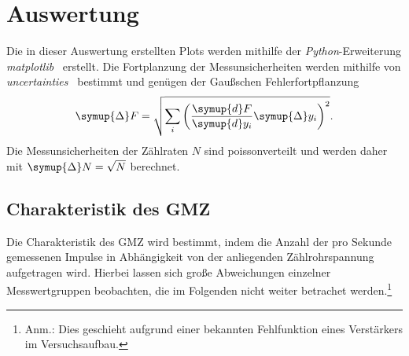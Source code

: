 \section{Auswertung}
\label{sec:Auswertung}
Die in dieser Auswertung erstellten Plots werden mithilfe der \textit{Python}-Erweiterung 
\textit{matplotlib}~\cite{matplotlib} erstellt. Die Fortplanzung der Messunsicherheiten werden mithilfe von
\textit{uncertainties}~\cite{uncertainties} bestimmt und genügen der Gaußschen Fehlerfortpflanzung
\begin{equation}
    \symup{\Delta} F = \sqrt{\sum_{i}\left(\frac{\symup{d}F}{\symup{d}y_{i}}\symup{\Delta} y_{i} \right)^2}.
    \label{eq:Gauss}
\end{equation}
Die Messunsicherheiten der Zählraten $N$ sind poissonverteilt und werden daher mit $\symup{\Delta}N = \sqrt{N}$ berechnet.

\subsection{Charakteristik des GMZ}
Die Charakteristik des GMZ wird bestimmt, indem die Anzahl der pro Sekunde gemessenen Impulse in Abhängigkeit
von der anliegenden Zählrohrspannung aufgetragen wird. Hierbei lassen sich große Abweichungen einzelner Messwertgruppen
beobachten, die im Folgenden nicht weiter betrachet werden.\footnote{Anm.: Dies geschieht aufgrund einer bekannten Fehlfunktion
eines Verstärkers im Versuchsaufbau.}

